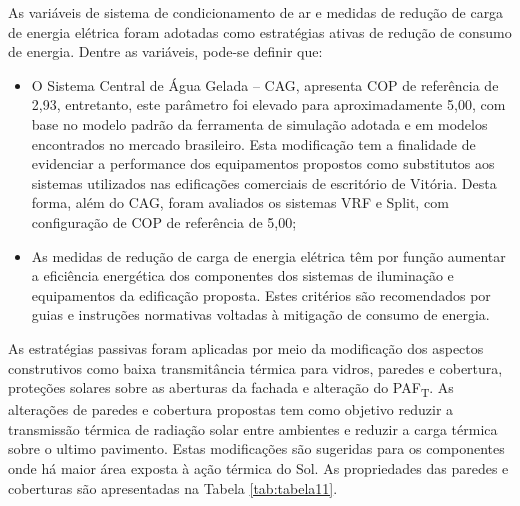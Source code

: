 \vspace{-0.5cm} \noindent As variáveis de sistema de condicionamento de ar e medidas de redução de carga de energia elétrica foram adotadas como estratégias ativas de redução de consumo de energia. Dentre as variáveis, pode-se definir que:
\begin{itemize}
    \item O Sistema Central de Água Gelada – CAG, apresenta COP de referência de 2,93, entretanto, este parâmetro foi elevado para aproximadamente 5,00, com base no modelo padrão da ferramenta de simulação adotada e em modelos encontrados no mercado brasileiro. Esta modificação tem a finalidade de evidenciar a performance dos equipamentos propostos como substitutos aos sistemas utilizados nas edificações comerciais de escritório de Vitória. Desta forma, além do CAG, foram avaliados os sistemas VRF e Split, com configuração de COP de referência de 5,00;
    \item As medidas de redução de carga de energia elétrica têm por função aumentar a eficiência energética dos componentes dos sistemas de iluminação e equipamentos da edificação proposta. Estes critérios são recomendados por guias \cite{AmericanSocietyofHeatingRefrigeratingandAir-ConditioningEngineers-ASHRAE2019} e instruções normativas \cite{InstitutoNacionaldeMetrologiaNormalizacaoeQualidadeIndustrial-INMETRO2018a} voltadas à mitigação de consumo de energia.
\end{itemize}
\noindent As estratégias passivas foram aplicadas por meio da modificação dos aspectos construtivos como baixa transmitância térmica para vidros, paredes e cobertura, proteções solares sobre as aberturas da fachada e alteração do PAF\textsubscript{T}.
\noindent As alterações de paredes e cobertura propostas tem como objetivo reduzir a transmissão térmica de radiação solar entre ambientes e reduzir a carga térmica sobre o ultimo pavimento. Estas modificações são sugeridas para os componentes onde há maior área exposta à ação térmica do Sol. As propriedades das paredes e coberturas são apresentadas na Tabela \ref{tab:tabela11}.
